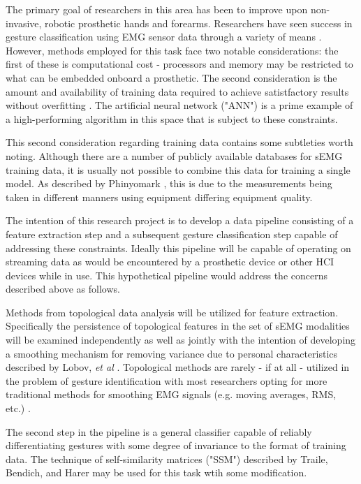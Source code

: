 \documentclass[11pt]{article}
\begin{document}
The primary goal of researchers in this area has been to improve upon non-invasive, robotic prosthetic hands and forearms. Researchers have seen success in gesture classification using EMG sensor data through a variety of means \cite{state}. However, methods employed for this task face two notable considerations: the first of these is computational cost - processors and memory may be restricted to what can be embedded onboard a prosthetic. The second consideration is the amount and availability of training data required to achieve satistfactory results without overfitting \cite{bigdata}. The artificial neural network ("ANN") is a prime example of a high-performing algorithm in this space that is subject to these constraints.

This second consideration regarding training data contains some subtleties worth noting. Although there are a number of publicly available databases for sEMG training data, it is usually not possible to combine this data for training a single model. As described by Phinyomark \cite{bigdata}, this is due to the measurements being taken in different manners using equipment differing equipment quality.

The intention of this research project is to develop a data pipeline consisting of a feature extraction step and a subsequent gesture classification step capable of addressing these constraints. Ideally this pipeline will be capable of operating on streaming data as would be encountered by a prosthetic device or other HCI devices while in use. This hypothetical pipeline would address the concerns described above as follows.

Methods from topological data analysis will be utilized for feature extraction. Specifically the persistence of topological features in the set of sEMG modalities will be examined independently as well as jointly with the intention of developing a smoothing mechanism for removing variance due to personal characteristics described by Lobov, \emph{et al} \cite{lobov}. Topological methods are rarely - if at all - utilized in the problem of gesture identification with most researchers opting for more traditional methods for smoothing EMG signals (e.g. moving averages, RMS, etc.) \cite{state}.

The second step in the pipeline is a general classifier capable of reliably differentiating gestures with some degree of invariance to the format of training data. The technique of self-similarity matrices ("SSM") described by Traile, Bendich, and Harer may be used for this task wtih some modification\cite{ssm}.
\end{document}
